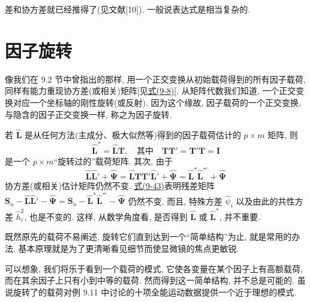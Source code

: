 
差和协方差就已经推得了(见文献[10]). 一般说表达式是相当复杂的.

\section{因子旋转}
\label{sec:9.4}

像我们在 9.2 节中曾指出的那样, 用一个正交变换从初始载荷得到的所有因子载荷, 同样有能力重现协方差(或相关)矩阵[见\hyperref[eq:9-8]{式(9-8)}]. 从矩阵代数我们知道, 一个正交变换对应一个坐标轴的刚性旋转(或反射). 因为这个缘故, 因子载荷的一个正交变换, 与隐含的因子正交变换一样, 称之为因子旋转.

若 $\hat{\mathbf{L}}$ 是从任何方法(主成分、极大似然等)得到的因子载荷估计的 $p\times m$ 矩阵, 则
\label{eq:9-42}
\begin{equation}
\hat{\mathbf{L}}^*=\hat{\mathbf{L}}\mathbf{T}, \quad \text{其中}\quad \mathbf{T}\mathbf{T}'=\mathbf{T}'\mathbf{T}=\mathbf{I} \tag{9-42}
\end{equation}
是一个 $p\times m$“旋转过的”载荷矩阵. 其次, 由于
\label{eq:9-43}
\begin{equation}
\hat{\mathbf{L}}\hat{\mathbf{L}}'+\hat{\boldsymbol{\Psi}}=\hat{\mathbf{L}}\mathbf{T}\mathbf{T}'\hat{\mathbf{L}}'+\hat{\boldsymbol{\Psi}}=\hat{\mathbf{L}}^*\hat{\mathbf{L}}^{*'}+\hat{\boldsymbol{\Psi}} \tag{9-43}
\end{equation}
协方差(或相关)估计矩阵仍然不变. \hyperref[eq:9-43]{式(9-43)}表明残差矩阵 $\mathbf{S}_n-\hat{\mathbf{L}}\hat{\mathbf{L}}'-\hat{\boldsymbol{\Psi}}=\mathbf{S}_n-\hat{\mathbf{L}}^*\hat{\mathbf{L}}^{*'}-\hat{\boldsymbol{\Psi}}$ 仍然不变. 而且, 特殊方差 $\hat{\psi}_i$ 以及由此的共性方差 $\hat{h}_i^2$, 也是不变的. 这样, 从数学角度看, 是否得到 $\hat{\mathbf{L}}$ 或 $\hat{\mathbf{L}}^*$, 并不重要.

既然原先的载荷不易阐述, 旋转它们直到达到一个“简单结构”为止, 就是常用的办法. 基本原理就是为了更清晰看见细节而使显微镜的焦点更敏锐.

可以想象, 我们将乐于看到一个载荷的模式, 它使各变量在某个因子上有高额载荷, 而在其余因子上只有小到中等的载荷. 然而得到这一简单结构, 并不总是可能的. 虽说旋转了的载荷对例 9.11 中讨论的十项全能运动数据提供一个近于理想的模式.

